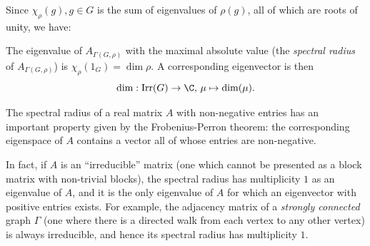Since $\chi_{\rho}(g), g\in G$ is the sum of eigenvalues of $\rho(g)$, all of 
which are roots of unity, we have:
\begin{coro}\label{cor:spectral_radius_adj_matrix}
 The eigenvalue of $A_{\Gamma(G, \rho)}$ with the maximal absolute value (the 
{\it spectral radius} of $A_{\Gamma(G, \rho)}$) is $\chi_\rho(1_G) = \dim \rho$. 
A corresponding eigenvector is then $$\dim:\mathrm{Irr}(G) \to \C, \, \mu \mapsto 
\dim(\mu).$$
\end{coro}

The spectral radius of a real matrix $A$ with non-negative entries has an important property given by the Frobenius-Perron theorem: the corresponding eigenspace of $A$ contains a vector all of whose entries are non-negative. 

In fact, if $A$ is an ``irreducible'' matrix (one which cannot be presented as a block matrix with non-trivial blocks), the spectral radius has multiplicity $1$ as an eigenvalue of $A$, and it is the only eigenvalue of $A$ for which an eigenvector with positive entries exists. For example, the adjacency matrix of a {\it strongly connected} graph $\Gamma$ (one where there is a directed walk from each vertex to any other vertex) is always irreducible, and hence its spectral radius has multiplicity $1$.


